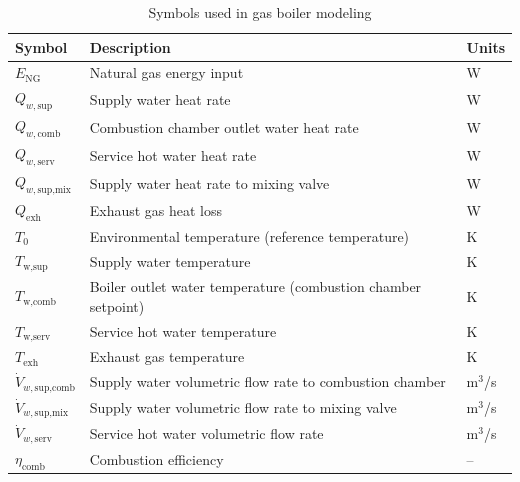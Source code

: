 \documentclass[final,5p,times,twocolumn,authoryear]{elsarticle}
\begin{document}
\begin{table}[t]
\centering
\caption{Symbols used in gas boiler modeling}
\label{tab:gb_symbols}
\renewcommand{\arraystretch}{1.2}
\small
\begin{tabularx}{\columnwidth}{l X l}
\toprule
\textbf{Symbol} & \textbf{Description} & \textbf{Units} \\
\midrule
$E_{\text{NG}}$ & Natural gas energy input & W \\
$Q_{w,\text{sup}}$ & Supply water heat rate & W \\
$Q_{w,\text{comb}}$ & Combustion chamber outlet water heat rate & W \\
$Q_{w,\text{serv}}$ & Service hot water heat rate & W \\
$Q_{w,\text{sup,mix}}$ & Supply water heat rate to mixing valve & W \\
$Q_{\text{exh}}$ & Exhaust gas heat loss & W \\
$T_0$ & Environmental temperature (reference temperature) & K \\
$T_{\text{w,sup}}$ & Supply water temperature & K \\
$T_{\text{w,comb}}$ & Boiler outlet water temperature (combustion chamber setpoint) & K \\
$T_{\text{w,serv}}$ & Service hot water temperature & K \\
$T_{\text{exh}}$ & Exhaust gas temperature & K \\
$\dot{V}_{w,\text{sup,comb}}$ & Supply water volumetric flow rate to combustion chamber & m$^3$/s \\
$\dot{V}_{w,\text{sup,mix}}$ & Supply water volumetric flow rate to mixing valve & m$^3$/s \\
$\dot{V}_{w,\text{serv}}$ & Service hot water volumetric flow rate & m$^3$/s \\
$\eta_{\text{comb}}$ & Combustion efficiency & -- \\
\bottomrule
\end{tabularx}
\end{table}



\end{document}
